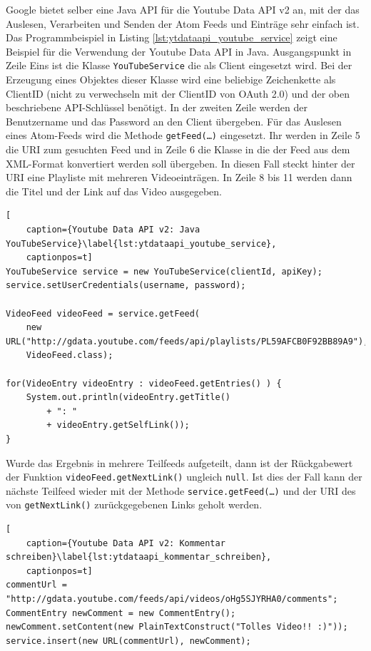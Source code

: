 Google bietet selber eine Java API für die Youtube Data API v2 an, mit der das Auslesen, Verarbeiten und Senden der Atom Feeds und Einträge sehr einfach ist. Das Programmbeispiel in Listing \ref{lst:ytdataapi_youtube_service} zeigt eine Beispiel für die Verwendung der Youtube Data API in Java. Ausgangspunkt in Zeile Eins ist die Klasse \texttt{YouTubeService} die als Client eingesetzt wird. Bei der Erzeugung eines Objektes dieser Klasse wird eine beliebige Zeichenkette als ClientID (nicht zu verwechseln mit der ClientID von OAuth 2.0) und der oben beschriebene API-Schlüssel benötigt. In der zweiten Zeile werden der Benutzername und das Password an den Client übergeben. Für das Auslesen eines Atom-Feeds wird die Methode \texttt{getFeed(\dots)} eingesetzt. Ihr werden in Zeile 5 die URI zum gesuchten Feed und in Zeile 6 die Klasse in die der Feed aus dem XML-Format konvertiert werden soll übergeben. In diesen Fall steckt hinter der URI eine Playliste mit mehreren Videoeinträgen. In Zeile 8 bis 11 werden dann die Titel und der Link auf das Video ausgegeben.

\begin{lstlisting}[
    caption={Youtube Data API v2: Java YouTubeService}\label{lst:ytdataapi_youtube_service},
    captionpos=t]
YouTubeService service = new YouTubeService(clientId, apiKey);
service.setUserCredentials(username, password);

VideoFeed videoFeed = service.getFeed(
    new URL("http://gdata.youtube.com/feeds/api/playlists/PL59AFCB0F92BB89A9"), 
    VideoFeed.class);

for(VideoEntry videoEntry : videoFeed.getEntries() ) {
    System.out.println(videoEntry.getTitle() 
        + ": " 
        + videoEntry.getSelfLink());
}
\end{lstlisting}

Wurde das Ergebnis in mehrere Teilfeeds aufgeteilt, dann ist der Rückgabewert der Funktion \texttt{videoFeed.getNextLink()} ungleich \texttt{null}. Ist dies der Fall kann der nächste Teilfeed wieder mit der Methode \texttt{service.getFeed(\dots)} und der URI des von \texttt{getNextLink()} zurückgegebenen Links geholt werden.

\begin{lstlisting}[
    caption={Youtube Data API v2: Kommentar schreiben}\label{lst:ytdataapi_kommentar_schreiben},
    captionpos=t]
commentUrl = "http://gdata.youtube.com/feeds/api/videos/oHg5SJYRHA0/comments";
CommentEntry newComment = new CommentEntry();
newComment.setContent(new PlainTextConstruct("Tolles Video!! :)"));
service.insert(new URL(commentUrl), newComment);
\end{lstlisting}

